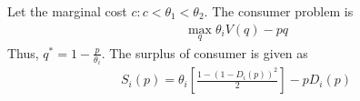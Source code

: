 \documentclass[11pt]{elegantbook}
\begin{document}
Let the marginal cost $c:c<\theta_1<\theta_2$. The consumer problem is
\begin{equation}
    \begin{aligned}
        \max_q \theta_i V(q)-pq
    \end{aligned}
    \nonumber
\end{equation}
Thus, $q^*=1-\frac{p}{\theta_i}$. The surplus of consumer is given as
\begin{equation}
    \begin{aligned}
        S_i(p)=\theta_i\left[\frac{1-(1-D_i(p))^2}{2}\right]-pD_i(p)
    \end{aligned}
    \nonumber
\end{equation}






















































































\end{document}
